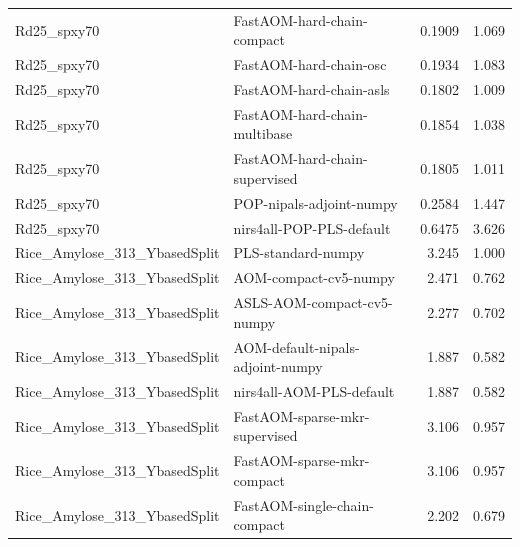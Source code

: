 \begin{landscape}
\begin{longtable}{L{8.0cm}L{9.5cm}rr}
Rd25\_\allowbreak{}spxy70 & FastAOM-\allowbreak{}hard-\allowbreak{}chain-\allowbreak{}compact & 0.1909 & 1.069 \\
Rd25\_\allowbreak{}spxy70 & FastAOM-\allowbreak{}hard-\allowbreak{}chain-\allowbreak{}osc & 0.1934 & 1.083 \\
Rd25\_\allowbreak{}spxy70 & FastAOM-\allowbreak{}hard-\allowbreak{}chain-\allowbreak{}asls & 0.1802 & 1.009 \\
Rd25\_\allowbreak{}spxy70 & FastAOM-\allowbreak{}hard-\allowbreak{}chain-\allowbreak{}multibase & 0.1854 & 1.038 \\
Rd25\_\allowbreak{}spxy70 & FastAOM-\allowbreak{}hard-\allowbreak{}chain-\allowbreak{}supervised & 0.1805 & 1.011 \\
Rd25\_\allowbreak{}spxy70 & POP-\allowbreak{}nipals-\allowbreak{}adjoint-\allowbreak{}numpy & 0.2584 & 1.447 \\
Rd25\_\allowbreak{}spxy70 & nirs4all-\allowbreak{}POP-\allowbreak{}PLS-\allowbreak{}default & 0.6475 & 3.626 \\
Rice\_\allowbreak{}Amylose\_\allowbreak{}313\_\allowbreak{}YbasedSplit & PLS-\allowbreak{}standard-\allowbreak{}numpy & 3.245 & 1.000 \\
Rice\_\allowbreak{}Amylose\_\allowbreak{}313\_\allowbreak{}YbasedSplit & AOM-\allowbreak{}compact-\allowbreak{}cv5-\allowbreak{}numpy & 2.471 & 0.762 \\
Rice\_\allowbreak{}Amylose\_\allowbreak{}313\_\allowbreak{}YbasedSplit & ASLS-\allowbreak{}AOM-\allowbreak{}compact-\allowbreak{}cv5-\allowbreak{}numpy & 2.277 & 0.702 \\
Rice\_\allowbreak{}Amylose\_\allowbreak{}313\_\allowbreak{}YbasedSplit & AOM-\allowbreak{}default-\allowbreak{}nipals-\allowbreak{}adjoint-\allowbreak{}numpy & 1.887 & 0.582 \\
Rice\_\allowbreak{}Amylose\_\allowbreak{}313\_\allowbreak{}YbasedSplit & nirs4all-\allowbreak{}AOM-\allowbreak{}PLS-\allowbreak{}default & 1.887 & 0.582 \\
Rice\_\allowbreak{}Amylose\_\allowbreak{}313\_\allowbreak{}YbasedSplit & FastAOM-\allowbreak{}sparse-\allowbreak{}mkr-\allowbreak{}supervised & 3.106 & 0.957 \\
Rice\_\allowbreak{}Amylose\_\allowbreak{}313\_\allowbreak{}YbasedSplit & FastAOM-\allowbreak{}sparse-\allowbreak{}mkr-\allowbreak{}compact & 3.106 & 0.957 \\
Rice\_\allowbreak{}Amylose\_\allowbreak{}313\_\allowbreak{}YbasedSplit & FastAOM-\allowbreak{}single-\allowbreak{}chain-\allowbreak{}compact & 2.202 & 0.679 \\

\end{longtable}
\end{landscape}
